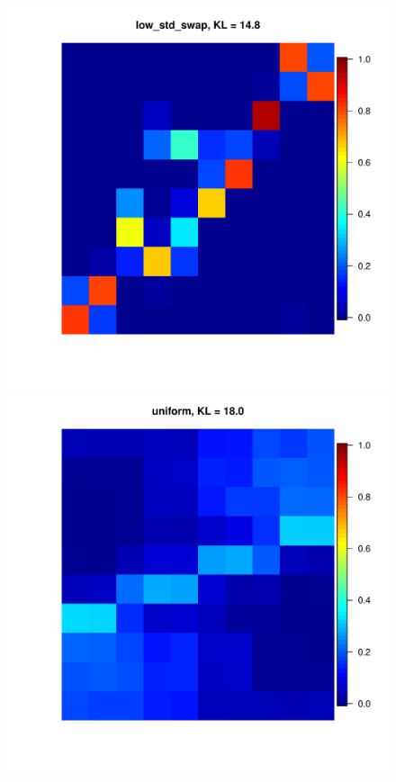 \documentclass[11pt, oneside]{article}   	%
\begin{document}
\begin{figure}[h!]
\begin{minipage}[t]{.45\textwidth}
		\end{minipage} 
		\hfill
		\begin{minipage}[t]{.45\textwidth}
			\centering
			\includegraphics[width=\textwidth]{figures/theorem2_2/heat_low_std_swap_N2000n10alpha1run1.pdf}
			
		\end{minipage} 
		\hfill
		\begin{minipage}[t]{.45\textwidth}
			\centering
			\includegraphics[width=\textwidth]{figures/theorem2_2/heat_uniform_N2000n10alpha1run1.pdf}
			

\end{minipage}
\end{figure}
\end{document}
